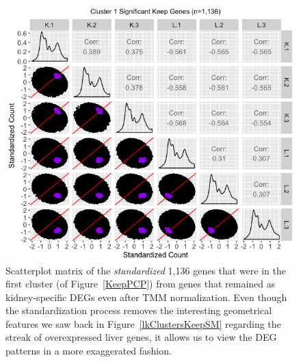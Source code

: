 \documentclass{article}
\begin{document}
\null
\begin{figure}[t!]
\centerline{\includegraphics[width=1\columnwidth]{../MakeFigures/lkClustersKeepSM-St.jpg}}
\caption{Scatterplot matrix of the \textit{standardized} 1,136 genes that were in the first cluster (of Figure~\ref{KeepPCP}) from genes that remained as kidney-specific DEGs even after TMM normalization. Even though the standardization process removes the interesting geometrical features we saw back in Figure~\ref{lkClustersKeepSM} regarding the streak of overexpressed liver genes, it allows us to view the DEG patterns in a more exaggerated fashion.
\label{lkClustersKeepSM-St}}
\end{figure}
\end{document}
